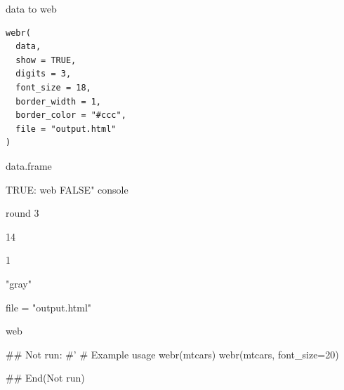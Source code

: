 \documentclass[a4paper]{book}
\begin{document}
%
\begin{Description}
data to web
\end{Description}
%
\begin{Usage}
\begin{verbatim}
webr(
  data,
  show = TRUE,
  digits = 3,
  font_size = 18,
  border_width = 1,
  border_color = "#ccc",
  file = "output.html"
)
\end{verbatim}
\end{Usage}
%
\begin{Arguments}
\begin{ldescription}
\item[\code{data}] data.frame

\item[\code{show}] TRUE: web FALSE" console

\item[\code{digits}] round 3

\item[\code{font\_size}] 14

\item[\code{border\_width}] 1

\item[\code{border\_color}] "gray"

\item[\code{file}] file = "output.html"
\end{ldescription}
\end{Arguments}
%
\begin{Value}
web
\end{Value}
%
\begin{Examples}
\begin{ExampleCode}

\#\# Not run: 
#'
# Example usage
webr(mtcars)
webr(mtcars, font_size=20)

## End(Not run)

\end{ExampleCode}
\end{Examples}
\end{document}
